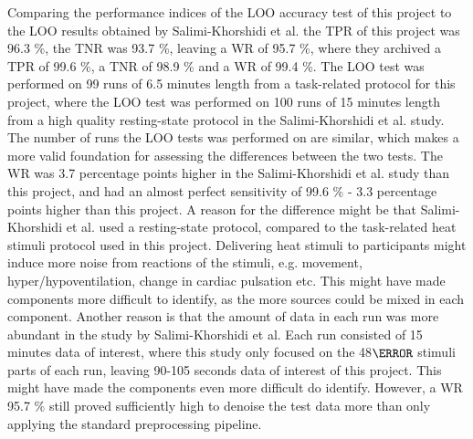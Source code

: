 Comparing the performance indices of the LOO accuracy test of this project to the LOO results obtained by Salimi-Khorshidi et al. \cite{Salimi-Khorshidi2014} the TPR of this project was 96.3 \%, the TNR was 93.7 \%, leaving a  WR of 95.7 \%, where they archived a TPR of 99.6 \%, a TNR of 98.9 \% and a WR of 99.4 \%. The LOO test was performed on 99 runs of 6.5 minutes length from a task-related protocol for this project, where the LOO test was performed on 100 runs of 15 minutes length from a high quality resting-state protocol in the Salimi-Khorshidi et al. study. The number of runs the LOO tests was performed on are similar, which makes a more valid foundation for assessing the differences between the two tests. 
The WR was 3.7 percentage points higher in the Salimi-Khorshidi et al. study than this project, and had an almost perfect sensitivity of 99.6 \% - 3.3 percentage points higher than this project. A reason for the difference might be that Salimi-Khorshidi et al. used a resting-state protocol, compared to the task-related heat stimuli protocol used in this project. Delivering heat stimuli to participants might induce more noise from reactions of the stimuli, e.g. movement, hyper/hypoventilation, change in cardiac pulsation etc. This might have made components more difficult to identify, as the more sources could be mixed in each component. Another reason is that the amount of data in each run was more abundant in the study by Salimi-Khorshidi et al. Each run consisted of 15 minutes data of interest, where this study only focused on the 48$\degree$ stimuli parts of each run, leaving 90-105 seconds data of interest of this project. This might have made the components even more difficult do identify. However, a WR 95.7 \% still proved sufficiently high to denoise the test data more than only applying the standard preprocessing pipeline. 

